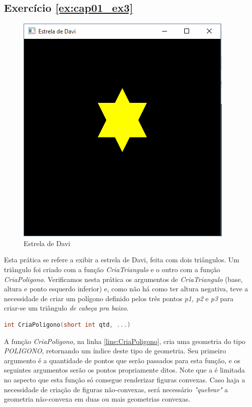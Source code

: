 \subsection*{Exercício \ref{ex:cap01_ex3}}
\begin{figure}[ht]
  \centerline{\includegraphics[width=.5\textwidth]{img/cap1_ex2.png}}
  \caption{Estrela de Davi}
  \label{fig:cap01_ex3}
\end{figure}
Esta prática se refere a exibir a estrela de Davi, feita com dois triângulos. Um triângulo foi criado com a função \emph{CriaTriangulo} e o outro com a função \emph{CriaPoligono}. Verificamos nesta prática os argumentos de \emph{CriaTriangulo} (base, altura e ponto esquerdo inferior) e, como não há como ter altura negativa, teve a necessidade de criar um polígono definido pelos três pontos \emph{p1, p2} e \emph{p3} para criar-se um triângulo \emph{de cabeça pra baixo}.


\begin{lstlisting}[label={func:CriaPoligono},language=C++]
int CriaPoligono(short int qtd, ...)
\end{lstlisting}
A função \emph{CriaPoligono}, na linha \ref{line:CriaPoligono}, cria uma geometria do tipo \emph{POLIGONO}, retornando um índice deste tipo de geometria. Seu primeiro argumento é a quantidade de pontos que serão passados para esta função, e os seguintes argumentos serão os pontos propriamente ditos. Note que a \playAPC{} é limitada no aspecto que esta função só consegue renderizar figuras convexas. Caso haja a necessidade de criação de figuras não-convexas, será necessário \emph{"quebrar"} a geometria não-convexa em duas ou mais geometrias convexas.

